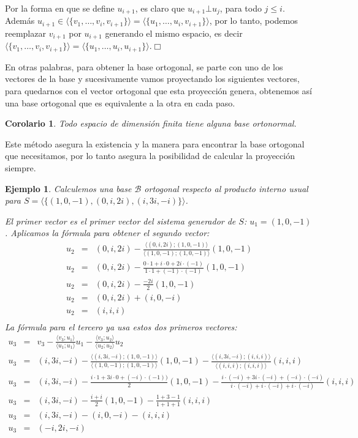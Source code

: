 \documentclass[12pt]{book}
\newtheorem{cor}{Corolario}
\newtheorem{ejem}{Ejemplo}
\begin{document}
{{  Por la forma en que se define $u_{i+1}$, es claro que $u_{i+1}\bot u_j$, para todo $j\le i$.
  Además $u_{i+1}\in\langle\{v_1,\dots, v_i,v_{i+1}\}\rangle=\langle\{u_1,\dots, u_i,v_{i+1}\}\rangle$, por lo tanto, podemos reemplazar $v_{i+1}$ por $u_{i+1}$ generando el mismo espacio, es decir $\langle\{v_1,\dots, v_i,v_{i+1}\}\rangle=\langle\{u_1,\dots, u_i,u_{i+1}\}\rangle$.\hfill$\Box$
}

En otras palabras, para obtener la base ortogonal, se parte con uno de los vectores de la base y sucesivamente vamos proyectando los siguientes vectores, para quedarnos con el vector ortogonal que esta proyección genera, obtenemos así una base ortogonal que es equivalente a la otra en cada paso.

\begin{cor}
Todo espacio de dimensión finita tiene alguna base ortonormal.
\end{cor}

Este método asegura la existencia y la manera para encontrar la base ortogonal que necesitamos, por lo tanto asegura la posibilidad de calcular la proyección siempre.

\begin{ejem}
Calculemos una base $\mathcal{B}$ ortogonal respecto al producto interno usual para \break $S=\langle\{(1,0,-1),(0,i,2i),(i,3i,-i)\}\rangle$.

{\em
El primer vector es el primer vector del sistema generador de $S$: $u_1=(1,0,-1)$. Aplicamos la fórmula para obtener el segundo vector:
\begin{eqnarray*}
u_2&=&(0,i,2i)-\frac{\langle (0,i,2i);(1,0,-1)\rangle}{\langle (1,0,-1);(1,0,-1)\rangle}(1,0,-1)\\
u_2&=&(0,i,2i)-\frac{0\cdot 1+i\cdot 0+2i\cdot(-1)}{1\cdot 1+(-1)\cdot(-1)}(1,0,-1)\\
u_2&=&(0,i,2i)-\frac{-2i}{2}(1,0,-1)\\
u_2&=&(0,i,2i)+(i,0,-i)\\
u_2&=&(i,i,i)\\
\end{eqnarray*}
La fórmula para el tercero ya usa estos dos primeros vectores:
\begin{eqnarray*}
u_3&=&v_3-\frac{\langle v_3; u_1\rangle}{\langle u_1;u_1\rangle}u_1-\frac{\langle v_3; u_2\rangle}{\langle u_2;u_2\rangle}u_2\\
u_3&=&(i,3i,-i)-\frac{\langle (i,3i,-i);(1,0,-1)\rangle}{\langle (1,0,-1);(1,0,-1)\rangle}(1,0,-1)-\frac{\langle (i,3i,-i);(i,i,i)\rangle}{\langle (i,i,i);(i,i,i)\rangle}(i,i,i)\\
u_3&=&(i,3i,-i)-\frac{i\cdot1+3i\cdot0+(-i)\cdot(-1))}{2}(1,0,-1)-\frac{i\cdot(-i)+3i\cdot(-i)+(-i)\cdot(-i)}{i\cdot(-i)+i\cdot(-i)+i\cdot(-i)}(i,i,i)\\
u_3&=&(i,3i,-i)-\frac{i+i}{2}(1,0,-1)-\frac{1+3-1}{1+1+1}(i,i,i)\\
u_3&=&(i,3i,-i)-(i,0,-i)-(i,i,i)\\
u_3&=&(-i,2i,-i)
\end{eqnarray*}

}
\end{ejem}}
\end{document}
